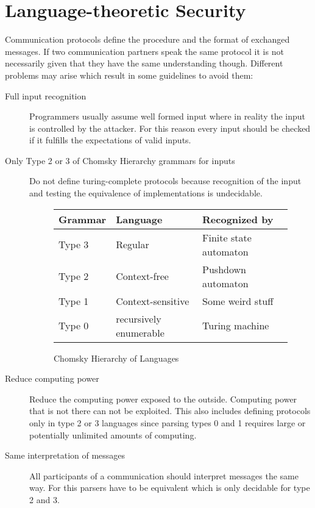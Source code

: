 
\section{Language-theoretic Security}
Communication protocols define the procedure and the format of exchanged messages.
If two communication partners speak the same protocol it is not necessarily given that they have the same understanding though.
Different problems may arise which result in some guidelines to avoid them:

\begin{description}
  \item[Full input recognition] Programmers usually assume well formed input where in reality the input is controlled by the attacker.
    For this reason every input should be checked if it fulfills the expectations of valid inputs.
  \item[Only Type 2 or 3 of Chomsky Hierarchy grammars for inputs]
    Do not define turing-complete protocols because recognition of the input and testing the equivalence of implementations is undecidable.
    \begin{figure}[h]
      \centering
      \begin{tabular}{l l l}
        Grammar & Language & Recognized by\\
        \midrule
        Type 3 & Regular & Finite state automaton\\
        Type 2 & Context-free & Pushdown automaton\\
        Type 1 & Context-sensitive & Some weird stuff\\
        Type 0 & recursively enumerable & Turing machine\\
      \end{tabular}
      \caption{Chomsky Hierarchy of Languages}
    \end{figure}
  \item[Reduce computing power] Reduce the computing power exposed to the outside.
    Computing power that is not there can not be exploited.
    This also includes defining protocols only in type 2 or 3 languages since parsing types 0 and 1 requires large or potentially unlimited amounts of computing.
  \item[Same interpretation of messages] All participants of a communication should interpret messages the same way.
    For this parsers have to be equivalent which is only decidable for type 2 and 3.
\end{description}

